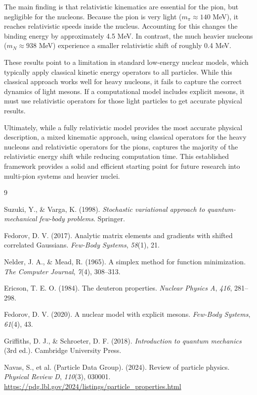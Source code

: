\documentclass[a4paper,oneside,article,12pt]{memoir}
\begin{document}
The main finding is that relativistic kinematics are essential for the pion, but negligible for the nucleons. Because the pion is very light ($m_π \approx 140$ MeV), it reaches relativistic speeds inside the nucleus. Accounting for this changes the binding energy by approximately 4.5 MeV. In contrast, the much heavier nucleons ($m_N \approx 938$ MeV) experience a smaller relativistic shift of roughly 0.4 MeV.

These results point to a limitation in standard low-energy nuclear models, which typically apply classical kinetic energy operators to all particles. While this classical approach works well for heavy nucleons, it fails to capture the correct dynamics of light mesons. If a computational model includes explicit mesons, it must use relativistic operators for those light particles to get accurate physical results.

Ultimately, while a fully relativistic model provides the most accurate physical description, a mixed kinematic approach, using classical operators for the heavy nucleons and relativistic operators for the pions, captures the majority of the relativistic energy shift while reducing computation time. This established framework provides a solid and efficient starting point for future research into multi-pion systems and heavier nuclei. 



\begin{thebibliography}{9}

    Suzuki, Y., \& Varga, K. (1998). \textit{Stochastic variational approach to quantum-mechanical few-body problems}. Springer.

    Fedorov, D. V. (2017). Analytic matrix elements and gradients with shifted correlated Gaussians. \textit{Few-Body Systems}, \textit{58}(1), 21.

    Nelder, J. A., \& Mead, R. (1965). A simplex method for function minimization. \textit{The Computer Journal}, \textit{7}(4), 308--313.

    Ericson, T. E. O. (1984). The deuteron properties. \textit{Nuclear Physics A}, \textit{416}, 281--298.

    Fedorov, D. V. (2020). A nuclear model with explicit mesons. \textit{Few-Body Systems}, \textit{61}(4), 43.

    Griffiths, D. J., \& Schroeter, D. F. (2018). \textit{Introduction to quantum mechanics} (3rd ed.). Cambridge University Press.


    Navas, S., et al. (Particle Data Group). (2024). Review of particle physics. \textit{Physical Review D}, \textit{110}(3), 030001. \url{https://pdg.lbl.gov/2024/listings/particle_properties.html}

\end{thebibliography}
\end{document}
